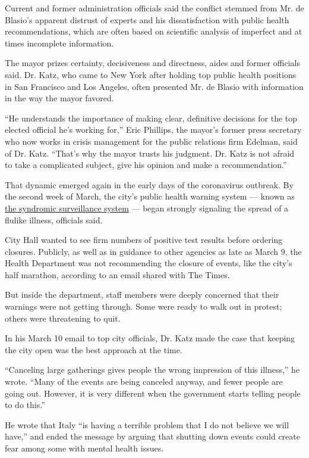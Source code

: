 Current and former administration officials said the conflict stemmed
from Mr. de Blasio's apparent distrust of experts and his
dissatisfaction with public health recommendations, which are often
based on scientific analysis of imperfect and at times incomplete
information.

The mayor prizes certainty, decisiveness and directness, aides and
former officials said. Dr. Katz, who came to New York after holding top
public health positions in San Francisco and Los Angeles, often
presented Mr. de Blasio with information in the way the mayor favored.

``He understands the importance of making clear, definitive decisions
for the top elected official he's working for,'' Eric Phillips, the
mayor's former press secretary who now works in crisis management for
the public relations firm Edelman, said of Dr. Katz. ``That's why the
mayor trusts his judgment. Dr. Katz is not afraid to take a complicated
subject, give his opinion and make a recommendation.''

That dynamic emerged again in the early days of the coronavirus
outbreak. By the second week of March, the city's public health warning
system --- known as
\href{https://a816-health.nyc.gov/hdi/epiquery/visualizations?PageType=ps\&PopulationSource=Syndromic}{the
syndromic surveillance system} --- began strongly signaling the spread
of a flulike illness, officials said.

City Hall wanted to see firm numbers of positive test results before
ordering closures. Publicly, as well as in guidance to other agencies as
late as March 9, the Health Department was not recommending the closure
of events, like the city's half marathon, according to an email shared
with The Times.

But inside the department, staff members were deeply concerned that
their warnings were not getting through. Some were ready to walk out in
protest; others were threatening to quit.

In his March 10 email to top city officials, Dr. Katz made the case that
keeping the city open was the best approach at the time.

``Canceling large gatherings gives people the wrong impression of this
illness,'' he wrote. ``Many of the events are being canceled anyway, and
fewer people are going out. However, it is very different when the
government starts telling people to do this.''

He wrote that Italy ``is having a terrible problem that I do not believe
we will have,'' and ended the message by arguing that shutting down
events could create fear among some with mental health issues.

